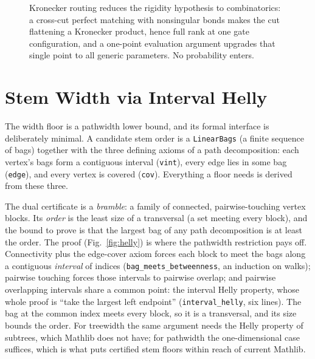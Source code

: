 \documentclass[sigplan,10pt,screen,review,anonymous]{acmart}
\begin{document}
\begin{figure}[t]
\centering
{}
\caption{Kronecker routing reduces the rigidity hypothesis to combinatorics: a cross-cut
perfect matching with nonsingular bonds makes the cut flattening a Kronecker product, hence
full rank at one gate configuration, and a one-point evaluation argument upgrades that
single point to all generic parameters. No probability enters.}
\label{fig:matching}
\end{figure}

\section{Stem Width via Interval Helly}\label{sec:bramble}

The width floor is a pathwidth lower bound, and its formal interface is deliberately
minimal. A candidate stem order is a \lstinline|LinearBags| (a finite sequence of bags)
together with the three defining axioms of a path decomposition: each vertex's bags
form a contiguous interval (\lstinline|vint|), every edge lies in some bag
(\lstinline|edge|), and every vertex is covered (\lstinline|cov|). Everything a floor needs
is derived from these three.

The dual certificate is a \emph{bramble}: a family of connected, pairwise-touching vertex
blocks. Its \emph{order} is the least size of a transversal (a set meeting every block),
and the bound to prove is that the largest bag of any path decomposition is at least the
order. The proof (Fig.~\ref{fig:helly}) is where the pathwidth restriction pays off.
Connectivity plus the edge-cover axiom forces each block to meet the bags along a
contiguous \emph{interval} of indices (\lstinline|bag_meets_betweenness|, an induction on
walks); pairwise touching forces those intervals to pairwise overlap; and pairwise
overlapping intervals share a common point: the interval Helly property, whose whole
proof is ``take the largest left endpoint''
(\lstinline|interval_helly|, six lines). The bag at the common index meets every block, so
it is a transversal, and its size bounds the order. For treewidth the same argument needs
the Helly property of subtrees, which Mathlib does not have; for pathwidth the
one-dimensional case suffices, which is what puts certified stem floors within reach of
current Mathlib.
\end{document}

